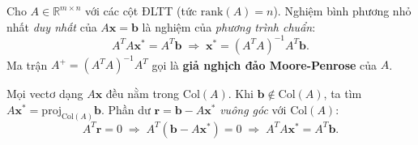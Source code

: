 \documentclass[12pt,a4paper]{article}
\begin{document}
\begin{congthuc}[title={Phương trình chuẩn}]
Cho $A \in \mathbb{R}^{m\times n}$ với các cột ĐLTT (tức $\mathrm{rank}(A) = n$). Nghiệm bình phương nhỏ nhất \emph{duy nhất} của $A\mathbf{x} = \mathbf{b}$ là nghiệm của \emph{phương trình chuẩn}:
\[
  A^T A \mathbf{x}^* = A^T \mathbf{b} \;\Longrightarrow\; \mathbf{x}^* = (A^T A)^{-1} A^T \mathbf{b}.
\]
Ma trận $A^+ = (A^T A)^{-1} A^T$ gọi là \textbf{giả nghịch đảo Moore-Penrose} của $A$.
\end{congthuc}

\begin{ynghia}[title={Trực giác hình học}]
Mọi vectơ dạng $A\mathbf{x}$ đều nằm trong $\mathrm{Col}(A)$. Khi $\mathbf{b} \notin \mathrm{Col}(A)$, ta tìm $A\mathbf{x}^* = \mathrm{proj}_{\mathrm{Col}(A)} \mathbf{b}$. Phần dư $\mathbf{r} = \mathbf{b} - A\mathbf{x}^*$ \emph{vuông góc} với $\mathrm{Col}(A)$:
\[
  A^T \mathbf{r} = 0 \;\Longrightarrow\; A^T(\mathbf{b} - A\mathbf{x}^*) = 0 \;\Longrightarrow\; A^T A \mathbf{x}^* = A^T \mathbf{b}.
\]
\end{ynghia}

\begin{center}
\end{center}
\end{document}
